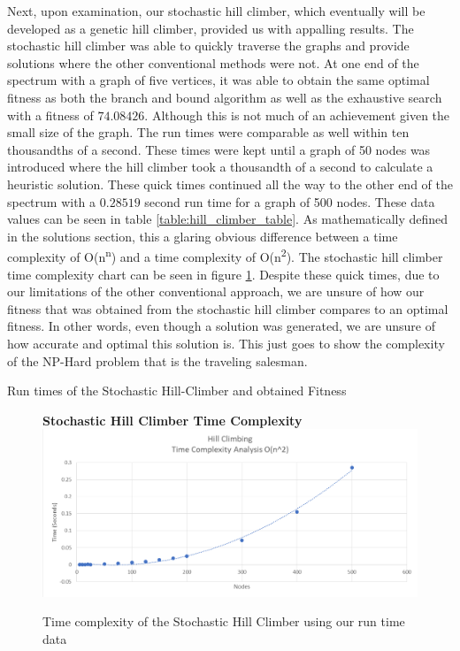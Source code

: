 \documentclass[sigplan,screen]{acmart}
\begin{document}
Next, upon examination, our stochastic hill climber, which eventually will be
developed as a genetic hill climber, provided us with appalling results. The
stochastic hill climber was able to quickly traverse the graphs and provide
solutions where the other conventional methods were not. At one end of the
spectrum with a graph of five vertices, it was able to obtain the same optimal
fitness as both the branch and bound algorithm as well as the exhaustive search
with a fitness of $74.08426$. Although this is not much of an achievement given
the small size of the graph. The run times were comparable as well within ten
thousandths of a second. These times were kept until a graph of 50 nodes was
introduced where the hill climber took a thousandth of a second to calculate a
heuristic solution. These quick times continued all the way to the other end of
the spectrum with a $0.28519$ second run time for a graph of 500 nodes. These
data values can be seen in table \ref{table:hill_climber_table}. As
mathematically defined in the solutions section, this a glaring obvious
difference between a time complexity of O(n\textsuperscript{n}) and a time
complexity of O(n\textsuperscript{2}).  The stochastic hill climber time
complexity chart can be seen in figure \ref{fig:hill_climber}. Despite these
quick times, due to our limitations of the other conventional approach, we are
unsure of how our fitness that was obtained from the stochastic hill climber
compares to an optimal fitness. In other words, even though a solution was
generated, we are unsure of how accurate and optimal this solution is. This just
goes to show the complexity of the NP-Hard problem that is the traveling
salesman.

\begin{table}[h]
    \setlength\tabcolsep{2pt}
    \centering
    
    \caption{Run times of the Stochastic Hill-Climber and obtained Fitness}
    \label{table:hill_climber_table}
\end{table}


\begin{figure}[h]
    \centering
    \textbf{Stochastic Hill Climber Time Complexity}
    \includegraphics[width=\columnwidth]{assets/hill_climber.png}
    \caption{Time complexity of the Stochastic Hill Climber using our run time data}
    \label{fig:hill_climber}
\end{figure}
\end{document}
